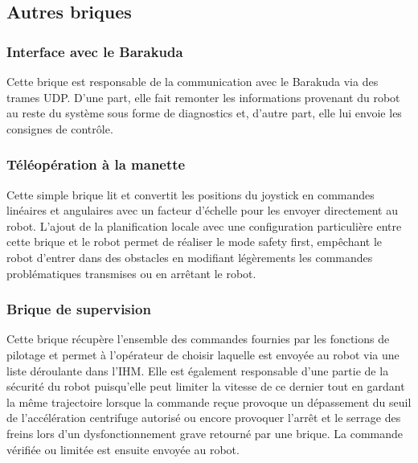 \subsection{Autres briques}

\subsubsection{Interface avec le Barakuda}
Cette brique est responsable de la communication avec le Barakuda via des trames UDP. D'une part, elle fait remonter les informations provenant du robot au reste du système sous forme de diagnostics et, d'autre part, elle lui envoie les consignes de contrôle.

\subsubsection{Téléopération à la manette}
Cette simple brique lit et convertit les positions du joystick en commandes linéaires et angulaires avec un facteur d'échelle pour les envoyer directement au robot. L'ajout de la planification locale avec une configuration particulière entre cette brique et le robot permet de réaliser le mode safety first, empêchant le robot d'entrer dans des obstacles en modifiant légèrements les commandes problématiques transmises ou en arrêtant le robot.

\subsubsection{Brique de supervision}
Cette brique récupère l'ensemble des commandes fournies par les fonctions de pilotage et permet à l'opérateur de choisir laquelle est envoyée au robot via une liste déroulante dans l'IHM. Elle est également responsable d'une partie de la sécurité du robot puisqu'elle peut limiter la vitesse de ce dernier tout en gardant la même trajectoire lorsque la commande reçue provoque un dépassement du seuil de l'accélération centrifuge autorisé ou encore provoquer l'arrêt et le serrage des freins lors d'un dysfonctionnement grave retourné par une brique. La commande vérifiée ou limitée est ensuite envoyée au robot.

